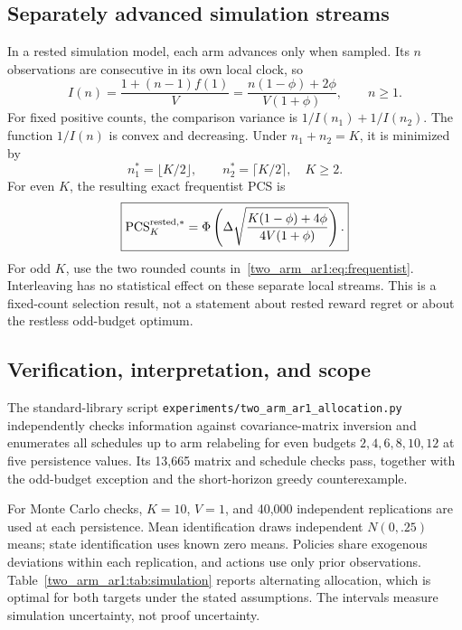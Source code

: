 \subsection{Separately advanced simulation streams}
In a rested simulation model, each arm advances only when sampled. Its $n$ observations are consecutive in its own local clock, so
\begin{equation}
I(n)=\frac{1+(n-1)f(1)}V
=\frac{n(1-\phi)+2\phi}{V(1+\phi)},\qquad n\geq1.
\end{equation}
For fixed positive counts, the comparison variance is $1/I(n_1)+1/I(n_2)$. The function $1/I(n)$ is convex and decreasing. Under $n_1+n_2=K$, it is minimized by
\begin{equation}
\boxed{n_1^*=\lfloor K/2\rfloor,\qquad n_2^*=\lceil K/2\rceil,\quad K\geq2.}
\end{equation}
For even $K$, the resulting exact frequentist PCS is
\begin{equation}
\boxed{\operatorname{PCS}_K^{\mathrm{rested},*}
=\Phi\left(\Delta\sqrt{
\frac{K(1-\phi)+4\phi}{4V(1+\phi)}}\right).}
\end{equation}
For odd $K$, use the two rounded counts in~\eqref{two_arm_ar1:eq:frequentist}. Interleaving has no statistical effect on these separate local streams. This is a fixed-count selection result, not a statement about rested reward regret or about the restless odd-budget optimum.

\subsection{Verification, interpretation, and scope}
The standard-library script \texttt{experiments/two\_arm\_ar1\_allocation.py} independently checks information against covariance-matrix inversion and enumerates all schedules up to arm relabeling for even budgets $2,4,6,8,10,12$ at five persistence values. Its 13,665 matrix and schedule checks pass, together with the odd-budget exception and the short-horizon greedy counterexample.

For Monte Carlo checks, $K=10$, $V=1$, and 40,000 independent replications are used at each persistence. Mean identification draws independent $N(0,.25)$ means; state identification uses known zero means. Policies share exogenous deviations within each replication, and actions use only prior observations. Table~\ref{two_arm_ar1:tab:simulation} reports alternating allocation, which is optimal for both targets under the stated assumptions. The intervals measure simulation uncertainty, not proof uncertainty.

